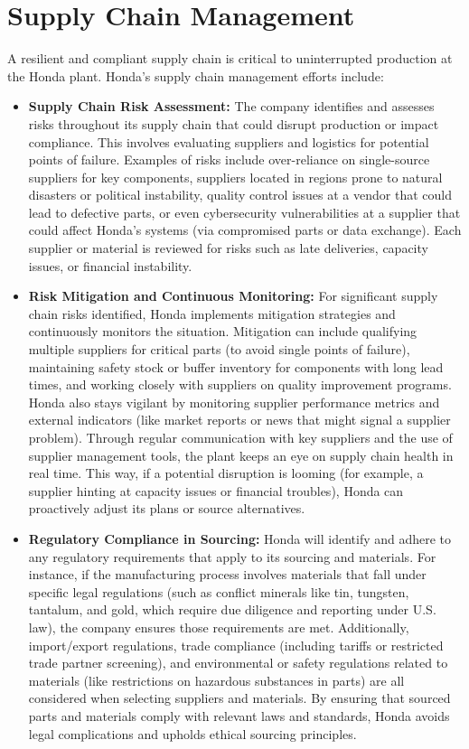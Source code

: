\section{Supply Chain Management}
A resilient and compliant supply chain is critical to uninterrupted production at the Honda plant. Honda’s supply chain management efforts include:
\begin{itemize}
    \item \textbf{Supply Chain Risk Assessment:} The company identifies and assesses risks throughout its supply chain that could disrupt production or impact compliance. This involves evaluating suppliers and logistics for potential points of failure. Examples of risks include over-reliance on single-source suppliers for key components, suppliers located in regions prone to natural disasters or political instability, quality control issues at a vendor that could lead to defective parts, or even cybersecurity vulnerabilities at a supplier that could affect Honda’s systems (via compromised parts or data exchange). Each supplier or material is reviewed for risks such as late deliveries, capacity issues, or financial instability.
    \item \textbf{Risk Mitigation and Continuous Monitoring:} For significant supply chain risks identified, Honda implements mitigation strategies and continuously monitors the situation. Mitigation can include qualifying multiple suppliers for critical parts (to avoid single points of failure), maintaining safety stock or buffer inventory for components with long lead times, and working closely with suppliers on quality improvement programs. Honda also stays vigilant by monitoring supplier performance metrics and external indicators (like market reports or news that might signal a supplier problem). Through regular communication with key suppliers and the use of supplier management tools, the plant keeps an eye on supply chain health in real time. This way, if a potential disruption is looming (for example, a supplier hinting at capacity issues or financial troubles), Honda can proactively adjust its plans or source alternatives.
    \item \textbf{Regulatory Compliance in Sourcing:} Honda will identify and adhere to any regulatory requirements that apply to its sourcing and materials. For instance, if the manufacturing process involves materials that fall under specific legal regulations (such as conflict minerals like tin, tungsten, tantalum, and gold, which require due diligence and reporting under U.S. law), the company ensures those requirements are met. Additionally, import/export regulations, trade compliance (including tariffs or restricted trade partner screening), and environmental or safety regulations related to materials (like restrictions on hazardous substances in parts) are all considered when selecting suppliers and materials. By ensuring that sourced parts and materials comply with relevant laws and standards, Honda avoids legal complications and upholds ethical sourcing principles.

\end{itemize}
